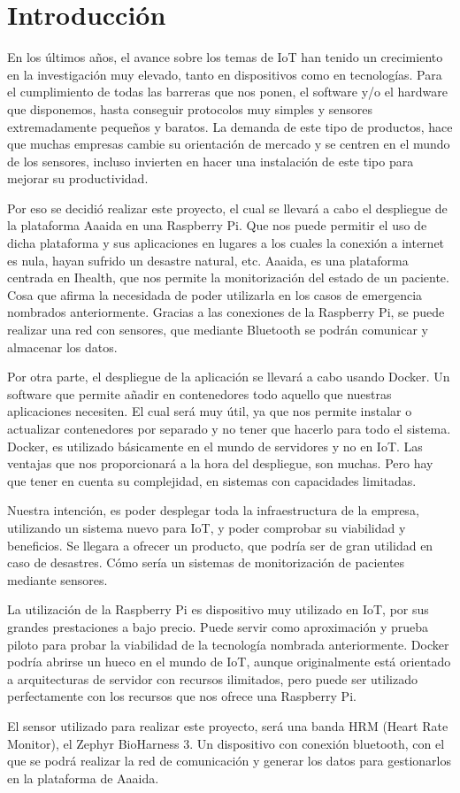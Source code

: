 \cleardoublepage
{}
\chapter*{Introducción}

En los últimos años, el avance sobre los temas de IoT han tenido un crecimiento en la investigación muy elevado, tanto en dispositivos como en tecnologías. Para el cumplimiento de todas las barreras que nos ponen, el software y/o el hardware que disponemos, hasta conseguir protocolos muy simples y sensores extremadamente pequeños y baratos. La demanda de este tipo de productos, hace que muchas empresas cambie su orientación de mercado y se centren en el mundo de los sensores,  incluso invierten en hacer una instalación de este tipo para mejorar su productividad. 

Por eso se decidió realizar este proyecto, el cual se llevará a cabo el despliegue de la plataforma Aaaida en una Raspberry Pi. Que nos puede permitir el uso de dicha plataforma y sus aplicaciones en lugares a los cuales la conexión a internet es nula, hayan sufrido un desastre natural, etc.  Aaaida, es una plataforma centrada en Ihealth, que nos permite la monitorización del estado de un paciente. Cosa que afirma la necesidada de poder utilizarla en los casos de emergencia nombrados anteriormente.
Gracias a las conexiones de la Raspberry Pi, se puede realizar una red con sensores, que mediante Bluetooth se podrán comunicar y almacenar los datos. 

Por otra parte, el despliegue de la aplicación se llevará a cabo usando Docker. Un software que permite añadir en contenedores todo aquello que nuestras aplicaciones necesiten. El cual será muy útil, ya que nos permite instalar o actualizar contenedores por separado y no tener que hacerlo para todo el sistema. Docker, es utilizado básicamente en el mundo de servidores y no en IoT. Las ventajas que nos proporcionará a la hora del despliegue, son muchas. Pero hay que tener en cuenta su complejidad, en sistemas con capacidades limitadas.

Nuestra intención, es poder desplegar toda la infraestructura de la empresa, utilizando un sistema nuevo para IoT, y poder comprobar su viabilidad y beneficios. Se llegara a ofrecer un producto, que podría ser de gran utilidad en caso de desastres. Cómo sería un sistemas de monitorización de pacientes mediante sensores. 

La utilización de la Raspberry Pi es dispositivo muy utilizado en IoT, por sus grandes prestaciones a bajo precio. Puede servir como aproximación y prueba piloto para  probar la viabilidad de la tecnología nombrada anteriormente. Docker podría abrirse un hueco en el mundo de IoT, aunque originalmente está orientado a arquitecturas de servidor con recursos ilimitados, pero puede ser utilizado perfectamente con los recursos que nos ofrece una Raspberry Pi. 

El sensor utilizado para realizar este proyecto, será una banda HRM (Heart Rate Monitor), el Zephyr BioHarness 3. Un dispositivo con conexión bluetooth, con el que se podrá realizar la red de comunicación y generar los datos para gestionarlos en la plataforma de Aaaida. 